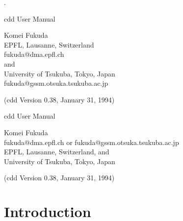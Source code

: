%
\renewcommand{\baselinestretch}{1.0}
\setlength{\oddsidemargin}{8mm}
\setlength{\textwidth}{16cm}
\setlength{\topmargin}{0mm}
\setlength{\textheight}{23cm}
\setlength{\headsep}{0in}
\setlength{\headheight}{0pt}

\pagestyle{empty}



.\vspace{20mm}

\begin{center}



\vspace{20mm}

{\LARGE cdd User Manual}

\vspace{20mm}

{\Large Komei Fukuda\\
   EPFL, Lausanne, Switzerland\\
   fukuda@dma.epfl.ch\\
   and\\
   University of Tsukuba, Tokyo, Japan\\
  fukuda@gssm.otsuka.tsukuba.ac.jp
}

\vspace{20mm}
{\Large (cdd Version 0.38,  January 31, 1994)}

\end{center}

\newpage
\pagestyle{plain}
\setcounter{page}{1} 

\begin{center}

{\Large cdd User Manual}

\bigskip
{\large Komei Fukuda\\
   fukuda@dma.epfl.ch  or  fukuda@gssm.otsuka.tsukuba.ac.jp\\
   EPFL, Lausanne, Switzerland, and\\
   University of Tsukuba, Tokyo, Japan}

\bigskip
{\large (cdd Version 0.38,  January 31, 1994)}

\end{center}

\section{Introduction} \label{INTRODUCTION}

